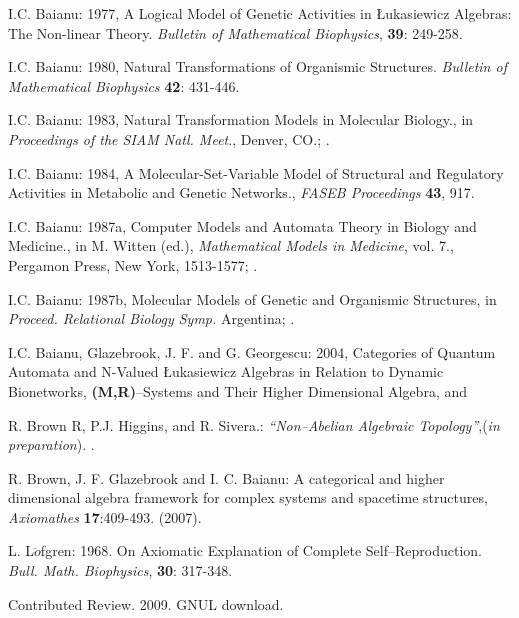 \documentclass[12pt]{article}
\theoremstyle{plain}
\theoremstyle{definition}
\numberwithin{equation}{section}
\begin{document}
\begin{thebibliography}{9}

I.C. Baianu: 1977, A Logical Model of Genetic Activities in \L ukasiewicz Algebras: The Non-linear Theory. \emph{Bulletin of Mathematical Biophysics}, \textbf{39}: 249-258.

I.C. Baianu: 1980, Natural Transformations of Organismic Structures. \emph{Bulletin of Mathematical Biophysics}
\textbf{42}: 431-446.

I.C. Baianu: 1983, Natural Transformation Models in Molecular Biology., in \emph{Proceedings of the SIAM Natl. Meet}., Denver, CO.;  .

I.C. Baianu: 1984, A Molecular-Set-Variable Model of Structural and Regulatory Activities in Metabolic and Genetic Networks., \emph{FASEB Proceedings} \textbf{43}, 917.

I.C. Baianu: 1987a, Computer Models and Automata Theory in Biology and Medicine.,  in M. Witten (ed.), 
\emph{Mathematical Models in Medicine}, vol. 7., Pergamon Press, New York, 1513-1577; .

I.C. Baianu: 1987b, Molecular Models of Genetic and Organismic Structures, in \emph{Proceed. Relational Biology Symp.} Argentina; .

I.C. Baianu, Glazebrook, J. F. and G. Georgescu: 2004, Categories of Quantum Automata and 
N-Valued \L ukasiewicz Algebras in Relation to Dynamic Bionetworks, \textbf{(M,R)}--Systems and
Their Higher Dimensional Algebra, 
 and 


R. Brown R, P.J. Higgins, and R. Sivera.: \emph{``Non--Abelian Algebraic Topology''},({\em in preparation}).
.  

R. Brown, J. F. Glazebrook and I. C. Baianu: A categorical and higher dimensional algebra framework for complex systems and spacetime structures, \emph{Axiomathes} \textbf{17}:409-493.
(2007).


L. L$\ddot{o}$fgren: 1968. On Axiomatic Explanation of Complete Self--Reproduction. \emph{Bull. Math. Biophysics}, 
\textbf{30}: 317-348.

Contributed Review. 2009. GNUL download.


\end{thebibliography}
\end{document}
